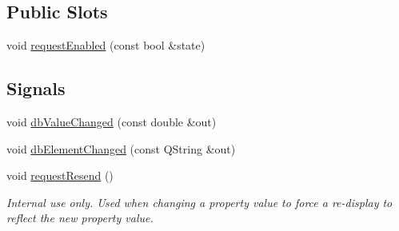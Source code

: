 \subsection*{Public Slots}
\begin{DoxyCompactItemize}
\item 
void \hyperlink{classQEPeriodic_aa3932a1de34a7f1c4ad7202ef1e1adbb}{requestEnabled} (const bool \&state)
\end{DoxyCompactItemize}
\subsection*{Signals}
\begin{DoxyCompactItemize}
\item 
void \hyperlink{classQEPeriodic_ae4921e20f8e20cbcf49eed2cba61363c}{dbValueChanged} (const double \&out)
\item 
void \hyperlink{classQEPeriodic_a40367f4ca3896a12405d9c42e4a0ded8}{dbElementChanged} (const QString \&out)
\item 
\hypertarget{classQEPeriodic_a4e9f08919ed7120e521783e5606f25b2}{
void \hyperlink{classQEPeriodic_a4e9f08919ed7120e521783e5606f25b2}{requestResend} ()}
\label{classQEPeriodic_a4e9f08919ed7120e521783e5606f25b2}

\begin{DoxyCompactList}\small\item\em Internal use only. Used when changing a property value to force a re-\/display to reflect the new property value. \end{DoxyCompactList}\end{DoxyCompactItemize}
